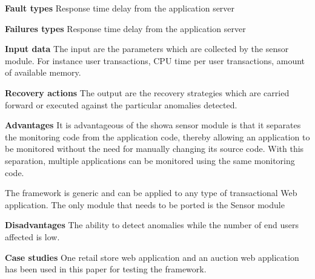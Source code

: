 \begin{compactitem}
\item[\textbf{Fault types}]Response time delay from the application server

\item[\textbf{Failures types}]Response time delay from the application server

\item[\textbf{Input data}] The input are the parameters which are collected by the sensor module. For instance user transactions, CPU time per user transactions, amount of available memory.

\item[\textbf{Recovery actions}]The output are the recovery strategies which are carried forward or executed against the particular anomalies detected.

\item[\textbf{Advantages}] It is advantageous of the showa sensor module is that it separates the monitoring code from the application code, thereby allowing an application to be monitored without the need for manually changing its source code. With this separation, multiple applications can be monitored using the same monitoring code.

The framework is generic and can be applied to any type of transactional Web application. The only module that needs to be ported is the Sensor module

\item[\textbf{Disadvantages}]The ability to detect anomalies while the number of end users affected is low.

\item[\textbf{Case studies}]One retail store web application and an auction web application has been used in this paper for testing the framework.
\end{compactitem}




